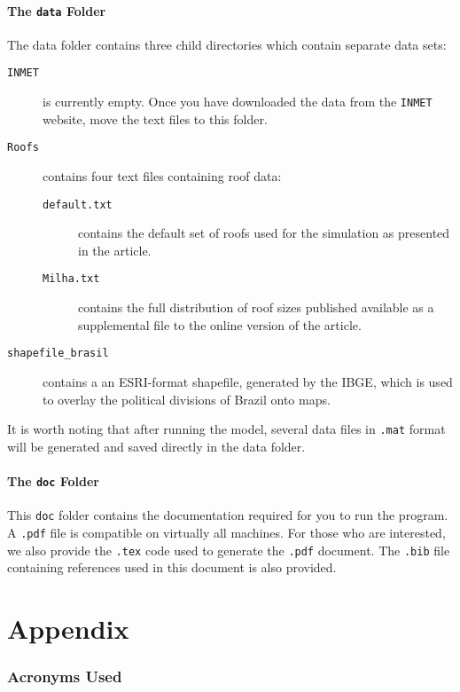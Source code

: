 \documentclass[11pt]{article} %
\newcommand{\fn}[1]{\texttt{#1}} %
\newcommand{\code}[1]{\texttt{#1}} %
\begin{document}
\subsection{The \fn{data} Folder} \label{dfolder}
The data folder contains three child directories which contain separate data sets:
\begin{description}
\item[\fn{INMET}] is currently empty. Once you have downloaded the data from the \fn{INMET} website, move the text files to this folder.
\item[\fn{Roofs}] contains four text files containing roof data:
\begin{description}
\item[\fn{default.txt}] contains the default set of roofs used for the simulation as presented in the article.
\item[\fn{Milha.txt}] contains the full distribution of roof sizes published available as a supplemental file to the online version of the article.
\end{description}
\item[\fn{shapefile\_brasil}] contains a an ESRI-format shapefile, generated by the \ac{IBGE}, which is used to overlay the political divisions of Brazil onto maps.
\end{description}
It is worth noting that after running the model, several data files in \fn{.mat} format will be generated and saved directly in the data folder.

\subsection{The \fn{doc} Folder} \label{doc}
This \fn{doc} folder contains the documentation required for you to run the program.
A \code{.pdf} file is compatible on virtually all machines.
For those who are interested, we also provide the \code{.tex} code used to generate the \code{.pdf} document.
The \code{.bib} file containing references used in this document is also provided.





\clearpage
\appendix
\part*{Appendix}

\section{Acronyms Used}

\begin{acronym}[INMET] %
\end{acronym}

\end{document}
